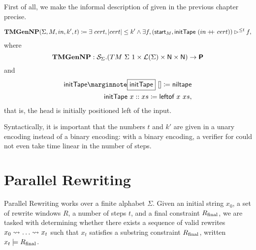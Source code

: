 First of all, we make the informal description of \gennp{} given in the previous chapter precise.
\begin{definition}[TMGenNP]\label{def:tmgennp}
  \begin{align*}
    \textbf{TMGenNP}{} (\Sigma, M,  in, k', t) \coloneqq \exists~cert, |cert| \le k' \land \exists f, ({\textsf{start}}_M, \textsf{initTape}~(in +\kern-1.3ex+\kern0.8ex cert)) \rhd^{\le t} f, 
  \end{align*}
  where 
  \[\textbf{TMGenNP}{} : \mathcal{S}_{{\Sigma}}. (TM~\Sigma~1 \times \mathcal{L} (\Sigma) \times \mathsf{N} \times \mathsf{N}) \rightarrow \textsf{\bfseries P} \]
  and 
  \begin{align*}
    \mnotec{\textsf{initTape}}~[] \defeq \textsf{niltape} \\
    \textsf{initTape}~x::xs \defeq \textsf{leftof}~x~xs,
  \end{align*}
  that is, the head is initially positioned left of the input.
\end{definition}

Syntactically, it is important that the numbers $t$ and $k'$ are given in a unary encoding instead of a binary encoding: with a binary encoding, a verifier for \gennp{} could not even take time linear in the number of steps. 

\section{Parallel Rewriting}\label{sec:pr}
Parallel Rewriting works over a finite alphabet $\Sigma$. Given an initial string $x_0$, a set of rewrite windows $R$, a number of steps $t$, and a final constraint $R_{\text{final}}$, we are tasked with determining whether there exists a sequence of valid rewrites $x_0 \rightsquigarrow_{} \ldots \rightsquigarrow_{} x_t$ such that $x_t$ satisfies a substring constraint $R_{\text{final}}$, written $x_t \models R_{\text{final}}$.


